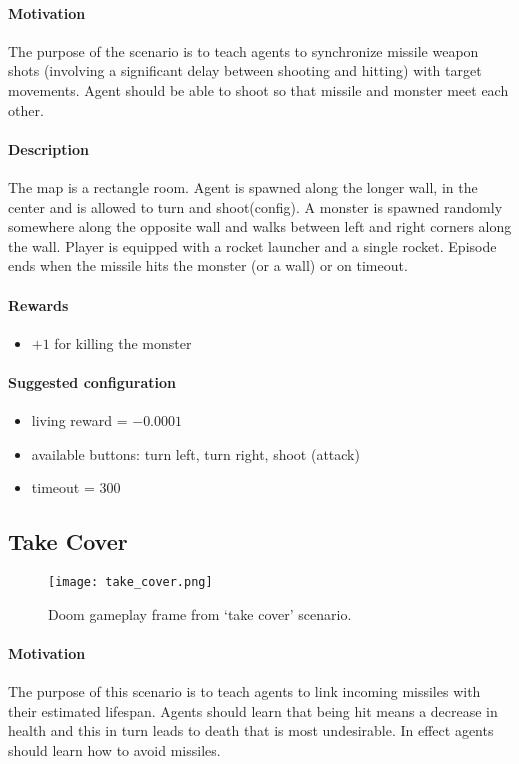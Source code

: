 		\paragraph{Motivation} 
			The purpose of the scenario is to teach agents to synchronize missile weapon shots (involving a significant delay between shooting and hitting) with target movements. Agent should be able to shoot so that missile and monster meet each other.

		\paragraph{Description}
			The map is a rectangle room. Agent is spawned along the longer wall, in the center and is allowed to turn and shoot(config). A monster is spawned randomly somewhere along the opposite wall and walks between left and right corners along the wall. Player is equipped with a rocket launcher and a single rocket. Episode ends when the missile hits the monster (or a wall) or on timeout.
		\paragraph{Rewards}
		\begin{itemize}
			\item $+1$ for killing the monster
		\end{itemize}
		
		\paragraph{Suggested configuration}
		\begin{itemize}
			\item living reward = $-0.0001$
			\item available buttons: turn left, turn right, shoot (attack)
			\item timeout = 300
		\end{itemize}
	\newpage

	\subsection{Take Cover}
		\begin{figure}
			\centering
			\texttt{[image: take\_cover.png]}
			\caption{Doom gameplay frame from `take cover' scenario.}
		\end{figure}
		\paragraph{Motivation} 
			The purpose of this scenario is to teach agents to link incoming missiles with their estimated lifespan. Agents should learn that being hit means a decrease in health and this in turn leads to death that is most undesirable. In effect agents should learn how to avoid missiles.

